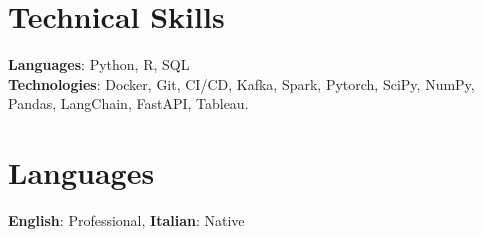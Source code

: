     

\resumeSubHeadingListEnd


\section{Technical Skills}
    \begin{itemize}[leftmargin=0.15in, label={}]
	\small{\item{
		\textbf{Languages}{: Python, R, SQL} \\
		\textbf{Technologies}{: Docker, Git, CI/CD, Kafka, Spark, Pytorch, SciPy, NumPy, Pandas, LangChain, FastAPI, Tableau.} \\}}
    \end{itemize}

\section{Languages}
     \begin{itemize}[leftmargin=0.15in, label={}]
 	\small{\item{
 		\textbf{English}: Professional, \textbf{Italian}: Native }}
     \end{itemize}

\clearpage


